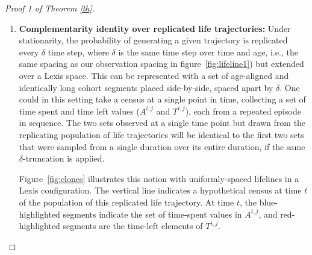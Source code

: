 \documentclass[12pt,oneside,a4paper]{article}
\theoremstyle{definition}
\newcommand{\vb}[1]{\texttt{#1}}
\begin{document}
\begin{proof}[Proof 1 of Theorem \ref{th}]
\begin{enumerate}
\begin{tcolorbox}
For example, from the  life trajectory in Tab.~\ref{tab:traj}, \vb{HSSH}, sickness might be the state of interest, in which case \vb{SS} becomes the episode of interest in this trajectory. If each time step is a year, $\delta = 1$, then we have $A^{21,1} = \{ 0,1,2 \}$ and $T^{21,1} = \{ 2,1,0 \}$: Where order does not matter, these are two equal sets. These figures are predicated on the strict and limiting assumption that the census is on January 1, each cohort is generated on January 1, and 0s (moment of entry or exit) are observed. This implies five observable points in a life passing through four age classes, but it simplifies the example by not having to specify a distribution over intervals.
\end{tcolorbox}



\FloatBarrier
\item{\textbf{Complementarity identity over replicated life trajectories:}} Under stationarity, the probability of generating a given trajectory is replicated every $\delta$ time step, where $\delta$ is the same time step over time and age, i.e., the same spacing as our observation spacing in figure~\ref{fig:lifeline1}) but extended over a
 Lexis space. This can be represented with a set of age-aligned and identically long cohort segments placed side-by-side, spaced apart by $\delta$.
One could in this setting take a census at a single point in time, collecting a set of
time spent and time left values ($A^{i,j}$ and $T^{i,j}$), each from a repeated episode in
sequence.
The two sets observed at a single time point but drawn from the replicating population of life trajectories will be identical to the first two sets that were sampled from
a single duration over its entire duration, if the same $\delta$-truncation is applied.

Figure~\ref{fig:clones} illustrates this notion with uniformly-spaced lifelines
in a Lexis configuration. The vertical line indicates a hypothetical census at time $t$ of
the population of this replicated life trajectory. At time $t$, the blue-highlighted segments indicate
the set of time-spent values in $A^{i,j}$, and red-highlighted segments are the
time-left elements of $T^{i,j}$. 


\end{enumerate}
\end{proof}
\end{document}
